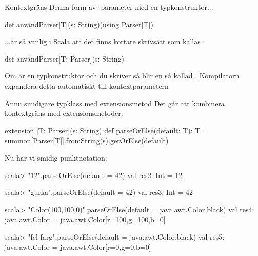 \begin{Slide}{Kontextgräns}\SlideFontSmall
Denna form av -parameter med en typkonstruktor...
\begin{Code}
def användParser[T](s: String)(using Parser[T])
\end{Code}
...är så vanlig i Scala att det finns kortare skrivsätt som kallas :
\begin{Code}
def användParser[T: Parser](s: String)
\end{Code}
Om  är en typkonstruktor och du skriver \code{[T: F]} så blir  en så kallad  . 
Kompilatorn expandera detta automatiskt till kontextparametern 
\end{Slide}



\begin{Slide}{Ännu smidigare typklass med extensionsmetod}\SlideFontSmall
Det går att kombinera kontextgräns med extensionsmetoder:
\begin{Code}
extension [T: Parser](s: String) 
  def parseOrElse(default: T): T = 
    summon[Parser[T]].fromString(s).getOrElse(default)
\end{Code}
Nu har vi smidig punktnotation:
\begin{REPLsmall}
scala> "12".parseOrElse(default = 42)
val res2: Int = 12

scala> "gurka".parseOrElse(default = 42)
val res3: Int = 42

scala> "Color(100,100,0)".parseOrElse(default = java.awt.Color.black)
val res4: java.awt.Color = java.awt.Color[r=100,g=100,b=0]

scala> "fel färg".parseOrElse(default = java.awt.Color.black)
val res5: java.awt.Color = java.awt.Color[r=0,g=0,b=0]

\end{REPLsmall}
\end{Slide}



